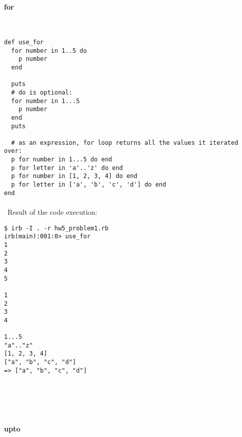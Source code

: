 \documentclass{article}
\begin{document}
\paragraph{}\
\paragraph{}\
\paragraph{}\



\paragraph{ for}\

\begin{verbatim}
def use_for
  for number in 1..5 do
    p number
  end

  puts
  # do is optional:
  for number in 1...5
    p number
  end
  puts
  
  # as an expression, for loop returns all the values it iterated over:
  p for number in 1...5 do end
  p for letter in 'a'..'z' do end
  p for number in [1, 2, 3, 4] do end
  p for letter in ['a', 'b', 'c', 'd'] do end
end
\end{verbatim}

\paragraph{}\
Result of the code execution:

\begin{verbatim} 
$ irb -I . -r hw5_problem1.rb
irb(main):001:0> use_for
1
2
3
4
5

1
2
3
4

1...5
"a".."z"
[1, 2, 3, 4]
["a", "b", "c", "d"]
=> ["a", "b", "c", "d"]
\end{verbatim}

\paragraph{}\
\paragraph{}\

\paragraph{ upto}\
\end{document}
